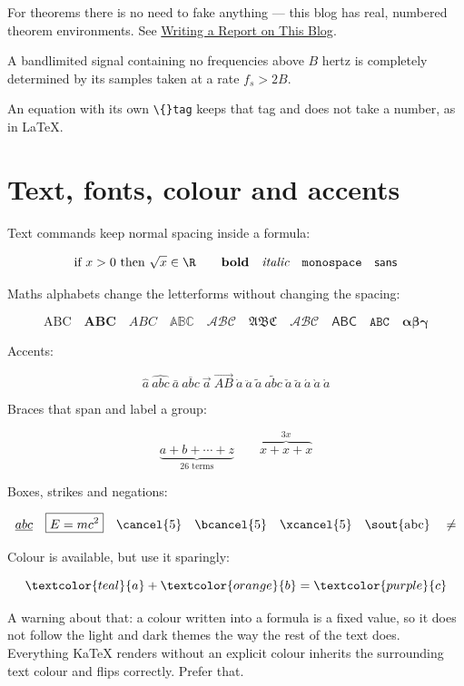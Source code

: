 For theorems there is no need to fake anything — this blog has real, numbered theorem environments. See \href{/blog/report-features-reference/theorems-definitions-and-proofs}{Writing a Report on This Blog}.

\begin{theorem}
A bandlimited signal containing no frequencies above $B$ hertz is completely determined by its samples taken at a rate $f_s > 2B$.
\end{theorem}

An equation with its own \texttt{\textbackslash\{\}tag} keeps that tag and does not take a number, as in LaTeX.

\section{Text, fonts, colour and accents}

Text commands keep normal spacing inside a formula:

\[
\text{if } x > 0 \text{ then } \sqrt{x} \in \R \qquad \textbf{bold} \quad \textit{italic} \quad \texttt{monospace} \quad \textsf{sans}
\]

Maths alphabets change the letterforms without changing the spacing:

\[
\mathrm{ABC} \quad \mathbf{ABC} \quad \mathit{ABC} \quad \mathbb{ABC} \quad \mathcal{ABC} \quad \mathfrak{ABC} \quad \mathscr{ABC} \quad \mathsf{ABC} \quad \mathtt{ABC} \quad \boldsymbol{\alpha\beta\gamma}
\]

Accents:

\[
\hat{a}\ \widehat{abc}\ \bar{a}\ \overline{abc}\ \vec{a}\ \overrightarrow{AB}\ \dot{a}\ \ddot{a}\ \tilde{a}\ \widetilde{abc}\ \check{a}\ \breve{a}\ \acute{a}\ \grave{a}\ \mathring{a}
\]

Braces that span and label a group:

\[
\underbrace{a + b + \cdots + z}_{26 \text{ terms}} \qquad \overbrace{x + x + x}^{3x}
\]

Boxes, strikes and negations:

\[
\underline{abc} \quad \boxed{E = mc^2} \quad \cancel{5} \quad \bcancel{5} \quad \xcancel{5} \quad \text{\sout{abc}} \quad \not=
\]

Colour is available, but use it sparingly:

\[
\textcolor{teal}{a} + \textcolor{orange}{b} = \textcolor{purple}{c}
\]

A warning about that: a colour written into a formula is a fixed value, so it does not follow the light and dark themes the way the rest of the text does. Everything KaTeX renders without an explicit colour inherits the surrounding text colour and flips correctly. Prefer that.

